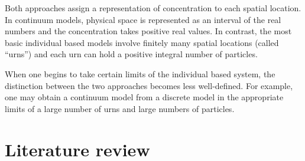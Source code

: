Both approaches assign a representation of concentration to each
spatial location. In continuum models, physical space is represented as an
interval of the real numbers and the concentration takes positive real values.
In contrast, the most basic individual based models involve finitely many
spatial locations (called ``urns'') and each urn can hold a positive integral
number of particles.

When one begins to take certain limits of the individual based system, the
distinction between the two approaches becomes less well-defined. For example,
one may obtain a continuum model from a discrete model in the appropriate limits
of a large number of urns and large numbers of particles. 

\section{Literature review}

